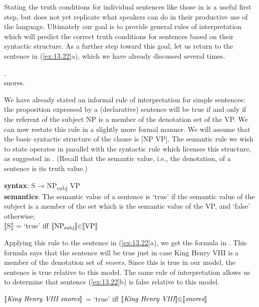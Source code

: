 Stating the truth conditions for individual sentences like those in  is a useful first step, but does not yet replicate what speakers can do in their productive use of the language. Ultimately our goal is to provide general rules of interpretation which will predict the correct truth conditions for sentences based on their syntactic structure. As a further step toward this goal, let us return to the sentence in (\ref{ex:13.22}a), which we have already discussed several times.


\ea \label{ex:13.22}
.\\
  {snores}.
                       \z
\z


We have already stated an informal rule of interpretation for simple sentences: the proposition expressed by a (declarative) sentence will be true if and only if the referent of the subject NP is a member of the denotation set of the VP. We can now restate this rule in a slightly more formal manner. We will assume that the basic syntactic structure of the clause is [NP VP]. The semantic rule we wish to state operates in parallel with the syntactic rule which licenses this structure, as suggested in . (Recall that the semantic value, i.e., the denotation, of a sentence is its truth value.)


\ea \label{ex:13.23}
\textbf{syntax}: S  →  NP\textsubscript{subj}  VP\\
\textbf{semantics}: The semantic value of a sentence is ‘true’ if the semantic value of the subject is a member of the set which is the semantic value of the VP, and ‘false’ otherwise;\\
{}$\llbracket\text{S}\rrbracket$  = ‘true’  iff  $\llbracket\text{NP\textsubscript{subj}}\rrbracket {\in} \llbracket\text{VP}\rrbracket$ 
\z


Applying this rule to the sentence in (\ref{ex:13.22}a), we get the formula in . This formula says that the sentence will be true just in case King Henry VIII is a member of the denotation set of \textit{snores}. Since this is true in our model, the sentence is true relative to this model. The same rule of interpretation allows us to determine that sentence (\ref{ex:13.22}b) is false relative to this model.


\ea \label{ex:13.24}
{}$\llbracket\text{\itshape King Henry VIII snores}\rrbracket$  = ‘true’  iff  $\llbracket\text{\itshape King Henry VIII}\rrbracket {\in} \llbracket\text{\itshape  snores}\rrbracket$ 
\z


